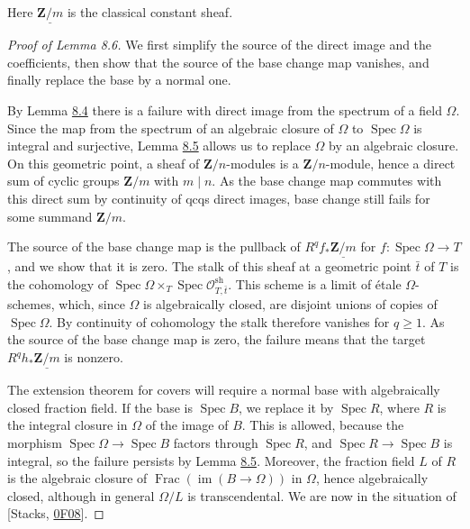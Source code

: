 \documentclass[11pt]{article}
\begin{document}
\label{bp27}%
Here \(\underline{\mathbf Z/m}\) is the classical constant sheaf.

\begin{proof}[{Proof of Lemma 8.6}]\label{bp28}%
We first simplify the source of the direct image and the coefficients, then show that the source of the base change map vanishes, and finally replace the base by a normal one.

By Lemma \hyperref[bp20]{8.4} there is a failure with direct image from the spectrum of a field \(\Omega\). Since the map from the spectrum of an algebraic closure of \(\Omega\) to \(\operatorname{Spec}\Omega\) is integral and surjective, Lemma \hyperref[bp23]{8.5} allows us to replace \(\Omega\) by an algebraic closure. On this geometric point, a sheaf of \(\mathbf Z/n\)-modules is a \(\mathbf Z/n\)-module, hence a direct sum of cyclic groups \(\mathbf Z/m\) with \(m\mid n\). As the base change map commutes with this direct sum by continuity of qcqs direct images, base change still fails for some summand \(\mathbf Z/m\).

The source of the base change map is the pullback of \(R^qf_*\underline{\mathbf Z/m}\) for \(f:\operatorname{Spec}\Omega\to T\), and we show that it is zero. The stalk of this sheaf at a geometric point \(\bar t\) of \(T\) is the cohomology of \(\operatorname{Spec}\Omega\times_T\operatorname{Spec}\mathcal O^{\mathrm{sh}}_{T,\bar t}\). This scheme is a limit of étale \(\Omega\)-schemes, which, since \(\Omega\) is algebraically closed, are disjoint unions of copies of \(\operatorname{Spec}\Omega\). By continuity of cohomology the stalk therefore vanishes for \(q\geq1\). As the source of the base change map is zero, the failure means that the target \(R^qh_*\underline{\mathbf Z/m}\) is nonzero.

The extension theorem for covers will require a normal base with algebraically closed fraction field. If the base is \(\operatorname{Spec}B\), we replace it by \(\operatorname{Spec}R\), where \(R\) is the integral closure in \(\Omega\) of the image of \(B\). This is allowed, because the morphism \(\operatorname{Spec}\Omega\to\operatorname{Spec}B\) factors through \(\operatorname{Spec}R\), and \(\operatorname{Spec}R\to\operatorname{Spec}B\) is integral, so the failure persists by Lemma \hyperref[bp23]{8.5}. Moreover, the fraction field \(L\) of \(R\) is the algebraic closure of \(\operatorname{Frac}(\operatorname{im}(B\to \Omega))\) in \(\Omega\), hence algebraically closed, although in general \(\Omega/L\) is transcendental. We are now in the situation of [Stacks, \href{https://stacks.math.columbia.edu/tag/0F08}{0F08}].
\end{proof}
\end{document}

